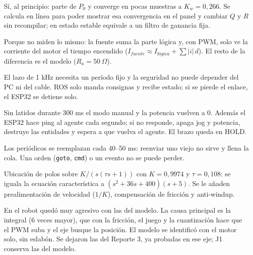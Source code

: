 \documentclass[11pt]{article}
\newcommand{\cod}[1]{\texttt{#1}}
\begin{document}
\begin{preg}
Sí, al principio: parte de $P_0$ y converge en pocas muestras a $K_w=0{,}266$. Se calcula en línea para poder mostrar esa convergencia en el panel y cambiar $Q$ y $R$ sin recompilar; en estado estable equivale a un filtro de ganancia fija.
\end{preg}

\begin{preg}
Porque no miden lo mismo: la fuente suma la parte lógica y, con PWM, solo ve la corriente del motor el tiempo encendido ($I_{fuente}\approx I_{lógica}+\sum|i|\,d$). El resto de la diferencia es el modelo ($R_a=50~\Omega$).
\end{preg}

\begin{preg}
El lazo de 1 kHz necesita un período fijo y la seguridad no puede depender del PC ni del cable. ROS solo manda consignas y recibe estado; si se pierde el enlace, el ESP32 se detiene solo.
\end{preg}

\begin{preg}
Sin latidos durante 300 ms el modo manual y la potencia vuelven a 0. Además el ESP32 hace ping al agente cada segundo; si no responde, apaga jog y potencia, destruye las entidades y espera a que vuelva el agente. El brazo queda en HOLD.
\end{preg}

\begin{preg}
Los periódicos se reemplazan cada 40--50 ms: reenviar uno viejo no sirve y llena la cola. Una orden (\cod{goto}, \cod{cmd}) o un evento no se puede perder.
\end{preg}

\begin{preg}
Ubicación de polos sobre $K/(s(\tau s+1))$ con $K=0{,}9974$ y $\tau=0{,}108$: se iguala la ecuación característica a $(s^2+36s+400)(s+5)$. Se le añaden prealimentación de velocidad ($1/K$), compensación de fricción y anti-windup.
\end{preg}

\begin{preg}
En el robot quedó muy agresivo con las del modelo. La causa principal es la integral (6 veces mayor), que con la fricción, el juego y la cuantización hace que el PWM suba y el eje busque la posición. El modelo se identificó con el motor solo, sin eslabón. Se dejaron las del Reporte 3, ya probadas en ese eje; J1 conserva las del modelo.
\end{preg}
\end{document}
